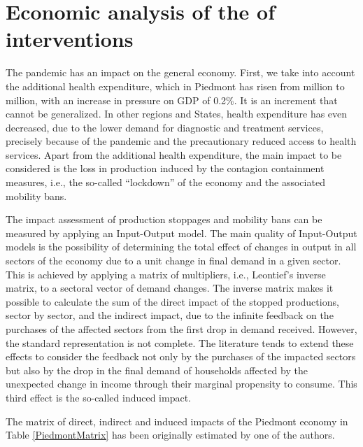 \documentclass[graybox]{svmult}
\begin{document}
\section{Economic analysis of the of interventions}
\label{CBanalysis}

The pandemic has an impact on the general economy. First, we take into account the additional health expenditure, which in Piedmont has risen from  million to  million, with an increase in pressure on GDP of 0.2\%. It is an increment that cannot be generalized. In other regions and States, health expenditure has even decreased, due to the lower demand for diagnostic and treatment services, precisely because of the pandemic and the precautionary reduced access to health services. Apart from the additional health expenditure, the main impact to be considered is the loss in production induced by the contagion containment measures, i.e., the so-called ``lockdown'' of the economy and the associated mobility bans. 

The impact assessment of production stoppages and mobility bans can be measured by applying an Input-Output model. The main quality of Input-Output models is the possibility of determining the total effect of changes in output in all sectors of the economy due to a unit change in final demand in a given sector. This is achieved by applying a matrix of multipliers, i.e., Leontief's inverse matrix, to a sectoral vector of demand changes. The inverse matrix makes it possible to calculate the sum of the direct impact of the stopped productions, sector by sector, and the indirect impact, due to the infinite feedback on the purchases of the affected sectors from the first drop in demand received. However, the standard representation is not complete. The literature tends to extend these effects to consider the feedback not only by the purchases of the impacted sectors but also by the drop in the final demand of households affected by the unexpected change in income through their marginal propensity to consume. This third effect is the so-called induced impact.

The matrix of direct, indirect and induced impacts of the Piedmont economy in Table \ref{PiedmontMatrix} has been originally estimated by one of the authors.
\end{document}
